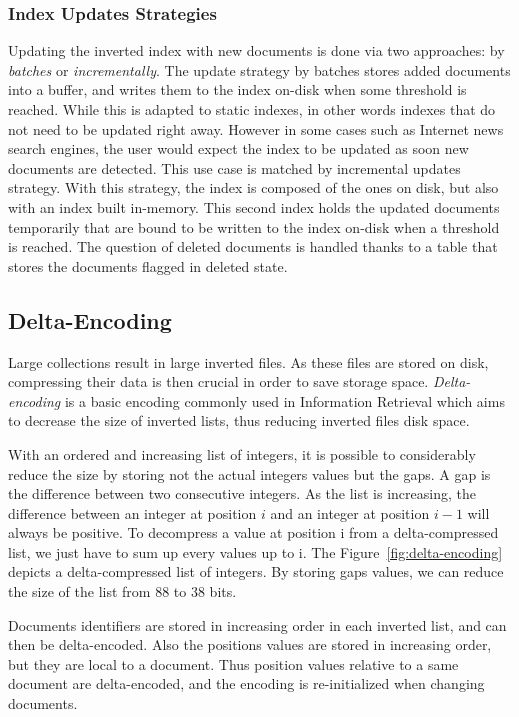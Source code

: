 \subsubsection{Index Updates Strategies}

Updating the inverted index with new documents is done via two approaches: by
\emph{batches} or \emph{incrementally}.
The update strategy by batches stores
added documents into a buffer, and writes them to the index on-disk when some
threshold is reached. While this is adapted to static indexes, in other words
indexes that do not need to be updated right away. However in some cases such
as Internet news search engines, the user would expect the index to be updated
as soon new documents are detected. This use case is matched by incremental
updates strategy. With this strategy, the index is composed of the ones on
disk, but also with an index built in-memory. This second index holds the
updated documents temporarily that are bound to be written to the index on-disk
when a threshold is reached.
The question of deleted documents is handled thanks to a table that stores the
documents flagged in deleted state.

\subsection{Delta-Encoding}

Large collections result in large inverted files. As these files are stored on
disk, compressing their data is then crucial in order to save storage space.
\emph{Delta-encoding} is a basic encoding commonly used in Information
Retrieval which aims to decrease the size of inverted lists, thus reducing
inverted files disk space.

With an ordered and increasing list of integers, it is possible to considerably
reduce the size by storing not the actual integers values but the gaps. A gap
is the difference between two consecutive integers. As the list is increasing,
the difference between an integer at position $i$ and an integer at position
$i-1$ will always be positive. To decompress a value at position i from a
delta-compressed list, we just have to sum up every values up to i. The
Figure~\ref{fig:delta-encoding} depicts a delta-compressed list of integers. By
storing gaps values, we can reduce the size of the list from 88 to 38 bits.

Documents identifiers are stored in increasing order in each inverted list, and
can then be delta-encoded. Also the positions values are stored in increasing
order, but they are local to a document. Thus position values relative to a
same document are delta-encoded, and the encoding is re-initialized when
changing documents.

